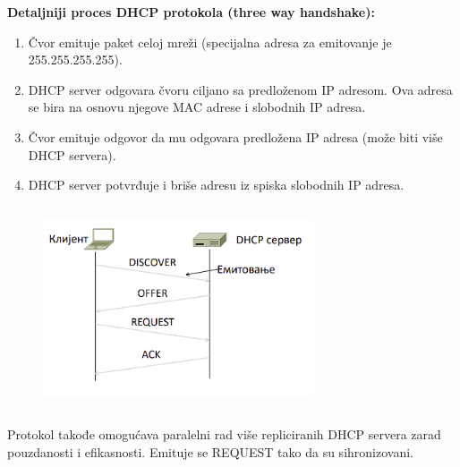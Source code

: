 \documentclass[a4paper]{article}
\begin{document}
        \noindent \textbf{Detaljniji proces DHCP protokola (three way handshake):}
        \begin{enumerate}
            \item Čvor emituje paket celoj mreži (specijalna adresa za emitovanje je 255.255.255.255).
            \item DHCP server odgovara čvoru ciljano sa predloženom IP adresom. Ova adresa se bira
                  na osnovu njegove MAC adrese i slobodnih IP adresa.
            \item Čvor emituje odgovor da mu odgovara predložena IP adresa (može biti više
                  DHCP servera).
            \item DHCP server potvrđuje i briše adresu iz spiska slobodnih IP adresa.
        \end{enumerate}
        \begin{figure}[H]
            \begin{center}
                \includegraphics[width=80mm,height=60mm]{Slike/dhcp.png}
            \end{center}
        \end{figure}
        Protokol takođe omogućava paralelni rad više repliciranih DHCP servera zarad pouzdanosti
        i efikasnosti. Emituje se REQUEST tako da su sihronizovani.
    
\end{document}
